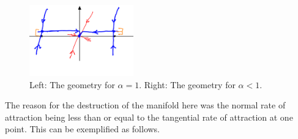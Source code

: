 \begin{ex}[]
\begin{figure}[h!]
	\includegraphics[width=0.4\textwidth]{figures/ch9/11_75alpha_small_perturb.png}
	\caption{Left: The geometry for $\alpha=1$. Right: The geometry for $\alpha<1$.}
	\label{fig:nondiffeo_pertubation}
\end{figure}

\end{ex}

The reason for the destruction of the manifold here was the normal rate of attraction being less than or equal to the tangential rate of attraction at one point. This can be exemplified as follows.

